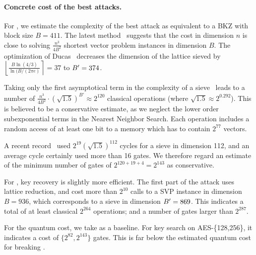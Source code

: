 \paragraph{Concrete cost of the best attacks.}
For , we estimate the complexity of the best attack as equivalent
to a BKZ with block size $B = 411$. The latest method~\cite{EC:ADHKPS19}
suggests that the cost
in dimension $n$ is close to solving $\frac{n^3}{4B^2}$ shortest vector
problem instances in dimension $B$.
The optimization of Ducas~\cite{EC:Ducas18} decreases the
dimension of the lattice sieved by $\left\lfloor \frac{B \ln(4/3)}{\ln(B / (2 \pi e)} \right\rceil = 37$ to $B' = 374$.

Taking only the first asymptotical term in the complexity of a
sieve~\cite{SODA:BDGL16} leads to a number of $\frac{n^3}{4B^2} \cdot (\sqrt{1.5})^{B'} \approx 2^{120}$ classical operations (where $\sqrt{1.5} \approx 2^{0.292}$).
This is believed to be a conservative estimate,
as we neglect the lower order subexponential terms in the Nearest Neighbor
Search.
Each operation includes a random access of at least one bit to
a memory which has to contain $2^{77}$ vectors.

A recent record~\cite{EC:ADHKPS19} used $2^{19} (\sqrt{1.5})^{112}$ cycles for a sieve in dimension 112, and an average cycle certainly used more than 16 gates.
We therefore regard an estimate of the minimum number of gates of
$2^{120+19+4}=2^{143}$ as conservative.


For , key recovery is slightly more efficient.
The first part of the attack uses lattice reduction, and cost more
than $2^{10}$ calls to a SVP instance in dimension $B = 936$, which corresponds to a sieve in dimension $B' = 869$.
This indicates a total of at least classical $2^{264}$ operations; and a number of gates
larger than $2^{287}$.

For the quantum cost, we take \cite[Table 10]{EC:JNRV20} as a baseline. For key search on AES-\{128,256\}, it indicates a cost of $\{2^{82}, 2^{143}\}$ gates. This is far below the estimated quantum cost for breaking \falcon.



